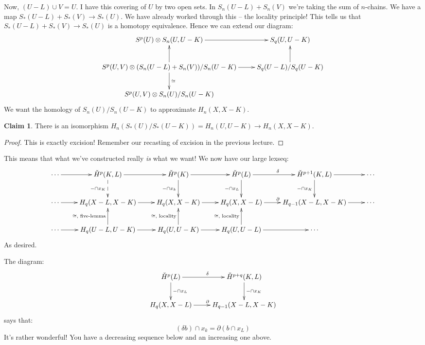 \documentclass{amsart}
\theoremstyle{theorem}
\theoremstyle{definition}
\newtheorem{claim}[theorem]{Claim}
\newcommand\cHH{\check{H}}
\begin{document}
Now, $(U-L)\cup V=U$. I have this covering of $U$ by two open sets. In $S_n(U-L)+S_n(V)$ we're taking the sum of $n$-chains. We have a map $S_\ast(U-L)+S_\ast(V)\to S_\ast(U)$. We have already worked through this -- the locality principle! This tells us that $S_\ast(U-L)+S_\ast(V)\to S_\ast(U)$ is a homotopy equivalence. Hence we can extend our diagram:
\begin{equation*}
\xymatrix{
	S^p(U)\otimes S_n(U,U-K)\ar[r] & S_q(U,U-K)\\
	S^p(U,V)\otimes (S_n(U-L)+S_n(V))/S_n(U-K)\ar[r]\ar[d]^{\simeq}\ar[u] & S_q(U-L)/S_q(U-K)\ar[u]\\
	S^p(U,V)\otimes S_n(U)/S_n(U-K) & 
}
\end{equation*}
We want the homology of $S_n(U)/S_n(U-K)$ to approximate $H_n(X,X-K)$.
\begin{claim}
There is an isomorphism $H_n(S_\ast(U)/S_\ast(U-K))=H_n(U,U-K)\to H_n(X,X-K)$.
\end{claim}
\begin{proof}
This is exactly excision! Remember our recasting of excision in the previous lecture.
\end{proof}
This means that what we've constructed really \emph{is} what we want! We now have our large lexseq:
\begin{equation*}
\xymatrix{
	\cdots\ar[r] & \cHH^p(K,L)\ar[r]\ar@{-->}[d]_{-\cap x_{K}} & \cHH^p(K)\ar[r]\ar[d]_{-\cap x_k} & \cHH^p(L)\ar[r]^\delta\ar[d]_{-\cap x_L} & \cHH^{p+1}(K,L)\ar[r]\ar[d]_{-\cap x_{K}} & \cdots\\
	\cdots\ar[r] & H_q(X-L,X-K)\ar[r]& H_q(X,X-K)\ar[r] & H_q(X,X-L)\ar[r]^\partial & H_{q-1}(X-L,X-K)\ar[r] & \cdots\\
	\cdots\ar[r] & H_q(U-L,U-K)\ar[r]\ar[u]^{\cong,\text{ five-lemma}} & H_q(U,U-K)\ar[r]\ar[u]^{\cong,\text{ locality}} & H_q(U,U-L)\ar[r]\ar[u]^{\cong,\text{ locality}} & \cdots
}
\end{equation*}
As desired.

The diagram:
\begin{equation*}
\xymatrix{
	\cHH^p(L)\ar[r]^\delta\ar[d]^{-\cap x_L} & \cHH^{p+q}(K,L)\ar[d]^{-\cap x_K}\\
	H_q(X,X-L)\ar[r]^{\partial} & H_{q-1}(X-L,X-K)
}
\end{equation*}
says that:
\begin{equation*}
(\delta b)\cap x_k=\partial(b\cap x_L)
\end{equation*}
It's rather wonderful! You have a decreasing sequence below and an increasing one above.
\end{document}
